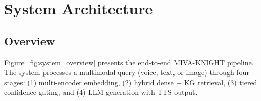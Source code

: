 \documentclass[10pt,conference]{IEEEtran}
\theoremstyle{ieeethm}
\theoremstyle{ieeedef}
\theoremstyle{ieeeremark}
\begin{document}
\section{System Architecture}
\label{sec:architecture}

\subsection{Overview}

Figure~\ref{fig:system_overview} presents the end-to-end MIVA-KNIGHT pipeline. The system processes a multimodal query (voice, text, or image) through four stages: (1) multi-encoder embedding, (2) hybrid dense + KG retrieval, (3) tiered confidence gating, and (4) LLM generation with TTS output.
\end{document}
